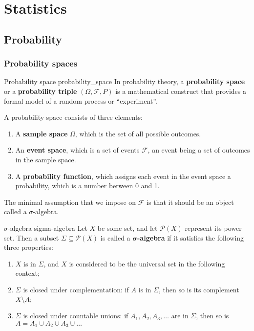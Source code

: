 \section{Statistics}

\subsection{Probability}

\subsubsection{Probability spaces}

\begin{definition}{Probability space \cite{math2901_notes}}{probability_space}
In probability theory, a \textbf{probability space} or a \textbf{probability triple} $(\Omega, \mathcal{F}, P)$ is a mathematical construct that provides a formal model of a random process or ``experiment''.

A probability space consists of three elements:
\begin{enumerate}
	\item A \textbf{sample space} $\Omega$, which is the set of all possible outcomes.
	\item An \textbf{event space}, which is a set of events $\mathcal{F}$, an event being a set of outcomes in the sample space.
	\item A \textbf{probability function}, which assigns each event in the event space a probability, which is a number between 0 and 1.
\end{enumerate}
\end{definition}

The minimal assumption that we impose on $\mathcal{F}$ is that it should be an object called a $\sigma$-algebra.

\begin{definition}{$\sigma$-algebra \cite{wikipedia_sigma_algebra}}{sigma-algebra}
Let $X$ be some set, and let $\mathcal{P}(X)$ represent its power set. Then a subset $\Sigma \subseteq \mathcal{P}(X)$ is called a $\bm{\sigma}$\textbf{-algebra} if it satisfies the following three properties:

\begin{enumerate}
	\item $X$ is in $\Sigma$, and $X$ is considered to be the universal set in the following context;
	\item $\Sigma$ is closed under complementation: if $A$ is in $\Sigma$, then so is its complement $X \setminus A$;
	\item $\Sigma$ is closed under countable unions: if $A_1, A_2, A_3, \ldots$ are in $\Sigma$, then so is $A = A_1 \cup A_2 \cup A_3 \cup \ldots$
\end{enumerate}
\end{definition}

